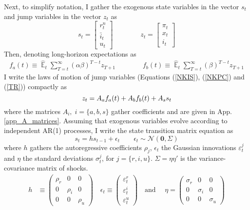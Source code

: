 \documentclass[11pt]{article}
\renewcommand{\[}{\begin{equation}}
\renewcommand{\]}{\end{equation}}
\DeclareMathOperator{\E}{\mathbb{E}}
\begin{document}
Next, to simplify notation,  I gather the exogenous state variables in the vector $s_t$ and jump variables in the vector $z_t$ as
\begin{equation}
s_t =  \begin{bmatrix}r_t^n \\ \bar{i}_t \\ u_t \end{bmatrix} \quad \quad \quad \quad  z_t = \begin{bmatrix}\pi_t \\ x_t \\ i_t \end{bmatrix}
\end{equation}
Then, denoting long-horizon expectations as 
 \begin{align}
f_a(t)  \equiv  \hat{\E}_t\sum_{T=t}^{\infty} (\alpha\beta)^{T-t } z_{T+1} \quad \quad \quad \quad f_b(t)  \equiv \hat{\E}_t\sum_{T=t}^{\infty} (\beta)^{T-t } z_{T+1} \label{fafb}
\end{align}
I write the laws of motion of jump variables (Equations (\ref{NKIS}), (\ref{NKPC}) and (\ref{TR})) compactly as
\begin{equation}
z_t  = A_af_a(t) + A_b f_b(t) + A_s s_t \label{LOM_LR} \\
\end{equation}
where the matrices $A_i, \; i=\{a,b,s\}$ gather coefficients and are given in App. \ref{app_A_matrices}. Assuming that exogenous variables evolve according to independent AR(1) processes, I write the state transition matrix equation as
 \begin{equation}
 s_t  = h s_{t-1} + \epsilon_t  \quad \quad \epsilon_t \sim \mathcal{N}(\mathbf{0}, \Sigma) \label{exog}
 \end{equation}
where $h$ gathers the autoregressive coefficients $\rho_j$, $\epsilon_t$ the Gaussian innovations $\varepsilon_t^j$ and $\eta$ the standard deviations $\sigma_t^j$, for $j=\{r,i,u\}$. $\Sigma = \eta \eta'$  is the variance-covariance matrix of shocks.
 \begin{align}
 h  & \equiv \begin{pmatrix} \rho_r & 0 & 0 \\ 0& \rho_i & 0 \\ 0&0& \rho_u 
 \end{pmatrix}  \quad 
 \epsilon_t \equiv \begin{pmatrix}\varepsilon_t^{r} \\ \varepsilon_t^{i}  \\ \varepsilon_t^{u} 
 \end{pmatrix}  \quad  \text{and } \quad \eta  =  \begin{pmatrix} \sigma_r & 0 & 0 \\ 0& \sigma_i & 0 \\ 0&0& \sigma_u 
 \end{pmatrix} 
 \end{align}
 
\end{document}
